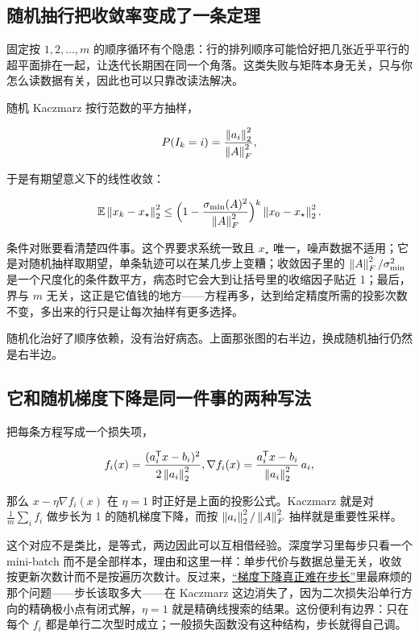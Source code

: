 \subsection{随机抽行把收敛率变成了一条定理}

固定按 \(1,2,\ldots,m\) 的顺序循环有个隐患：行的排列顺序可能恰好把几张近乎平行的超平面排在一起，让迭代长期困在同一个角落。这类失败与矩阵本身无关，只与你怎么读数据有关，因此也可以只靠改读法解决。

随机 Kaczmarz 按行范数的平方抽样，

\[
P(I_k=i)=\frac{\left\lVert a_i\right\rVert_2^2}{\left\lVert A\right\rVert_F^2},
\]

于是有期望意义下的线性收敛：

\[
\mathbb{E}\left\lVert x_k-x_\star\right\rVert_2^2
\le\Bigl(1-\frac{\sigma_{\min}(A)^2}{\left\lVert A\right\rVert_F^2}\Bigr)^{k}\left\lVert x_0-x_\star\right\rVert_2^2 .
\]

条件对账要看清楚四件事。这个界要求系统一致且 \(x_\star\) 唯一，噪声数据不适用；它是对随机抽样取期望，单条轨迹可以在某几步上变糟；收敛因子里的 \(\left\lVert A\right\rVert_F^2/\sigma_{\min}^2\) 是一个尺度化的条件数平方，病态时它会大到让括号里的收缩因子贴近 1；最后，界与 \(m\) 无关，这正是它值钱的地方——方程再多，达到给定精度所需的投影次数不变，多出来的行只是让每次抽样有更多选择。

随机化治好了顺序依赖，没有治好病态。上面那张图的右半边，换成随机抽行仍然是右半边。

\subsection{它和随机梯度下降是同一件事的两种写法}

把每条方程写成一个损失项，

\[
f_i(x)=\frac{(a_i^{\mathsf{T}}x-b_i)^2}{2\left\lVert a_i\right\rVert_2^2},
\space
\nabla f_i(x)=\frac{a_i^{\mathsf{T}}x-b_i}{\left\lVert a_i\right\rVert_2^2}\,a_i ,
\]

那么 \(x-\eta\nabla f_i(x)\) 在 \(\eta=1\) 时正好是上面的投影公式。Kaczmarz 就是对 \(\frac1m\sum_i f_i\) 做步长为 1 的随机梯度下降，而按 \(\left\lVert a_i\right\rVert_2^2/\left\lVert A\right\rVert_F^2\) 抽样就是重要性采样。

这个对应不是类比，是等式，两边因此可以互相借经验。深度学习里每步只看一个 mini-batch 而不是全部样本，理由和这里一样：单步代价与数据总量无关，收敛按更新次数计而不是按遍历次数计。反过来，\hyperref[sec:09-Convex-Optimization/06-Optimization-Algorithms/01]{``梯度下降真正难在步长''}里最麻烦的那个问题——步长该取多大——在 Kaczmarz 这边消失了，因为二次损失沿单行方向的精确极小点有闭式解，\(\eta=1\) 就是精确线搜索的结果。这份便利有边界：只在每个 \(f_i\) 都是单行二次型时成立；一般损失函数没有这种结构，步长就得自己调。


